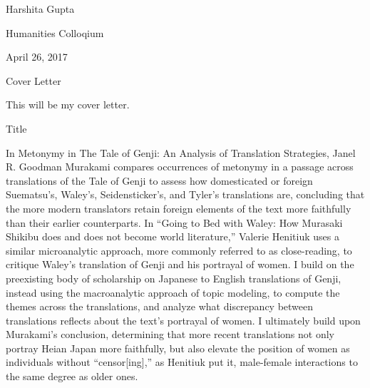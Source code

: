 \documentclass[12pt]{article}
\newenvironment{coverletter}{\begin{center} Cover Letter \end{center}}{\newpage }
\begin{document}
\begin{flushleft}
	

\begin{spacing}{2.0}
Harshita Gupta

Humanities Colloqium 

April 26, 2017

\begin{coverletter}
	This will be my cover letter.
\end{coverletter}
	

\begin{center}
Title
\end{center}

\setlength{\parindent}{0.5in} 

In Metonymy in The Tale of Genji: An Analysis of Translation Strategies, Janel R. Goodman Murakami compares occurrences of metonymy in a passage across translations of the Tale of Genji to assess how domesticated or foreign Suematsu’s, Waley’s, Seidensticker’s, and Tyler’s translations are, concluding that the more modern translators retain foreign elements of the text more faithfully than their earlier counterparts. In “Going to Bed with Waley: How Murasaki Shikibu does and does not become world literature,” Valerie Henitiuk uses a similar microanalytic approach, more commonly referred to as close-reading, to critique Waley’s translation of Genji and his portrayal of women. I build on the preexisting body of scholarship on Japanese to English translations of Genji, instead using the macroanalytic approach of topic modeling, to compute the themes across the translations, and analyze what discrepancy between translations reflects about the text’s portrayal of women. I ultimately build upon Murakami’s conclusion, determining that more recent translations not only portray Heian Japan more faithfully, but also elevate the position of women as individuals without “censor[ing],” as Henitiuk put it, male-female interactions to the same degree as older ones. 


\end{spacing}
\end{flushleft}
\end{document}
